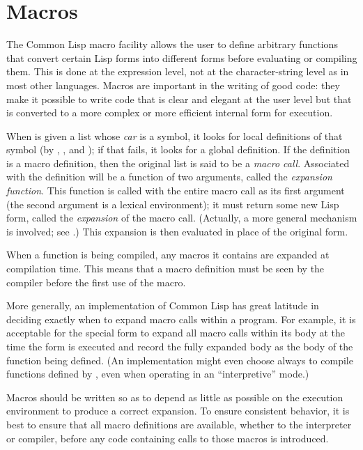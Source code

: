 
\clearpage\def\pagestatus{ULTIMATE}

\chapter{Macros}
\label{MACROS}


The Common Lisp macro facility allows the user to define arbitrary
functions that convert certain Lisp forms into different forms before
evaluating or compiling them.  This is done at the expression level,
not at the character-string level as in most other languages.  Macros
are important in the writing of good code: they make it possible to
write code that is clear and elegant at the user level but that is
converted to a more complex or more efficient internal form for
execution.

When  is given a list whose \emph{car} is a symbol, it looks
for local definitions of that symbol (by , ,
and ); if that fails, it looks for a global definition.
If the definition is a macro definition, then the original
list is said to be a \emph{macro call}.  Associated with the definition
will be a function of two arguments, called the \emph{expansion function}.
This function is called with the entire macro call as its first argument
(the second argument is a lexical environment);
it must return some new Lisp form, called the \emph{expansion} of the
macro call.  (Actually, a more general mechanism is involved;
see .)
This expansion is then evaluated in place of the original
form.

When a function is being compiled, any macros it contains are expanded
at compilation time.  This means that a macro definition must be seen by the
compiler before the first use of the macro.

More generally, an implementation of Common Lisp has great latitude in deciding
exactly when to expand macro calls within a program.  For example,
it is acceptable for the  special form to expand all macro
calls within its body at the time the  form is executed
and record the fully expanded body as the body of the function
being defined.
(An implementation might even choose always to compile functions defined
by , even when operating in an ``interpretive'' mode.)

Macros should be written so as to depend as little as possible
on the execution environment to produce a correct expansion.  To ensure
consistent behavior, it is best to ensure that all macro definitions are
available, whether to the interpreter or compiler, before any code
containing calls to those macros is introduced.

